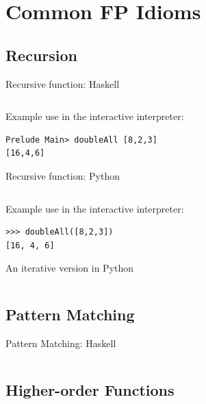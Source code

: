 \documentclass{beamer}
\begin{document}
\section{Common FP Idioms}
\subsection{Recursion}

\begin{frame}[fragile]{Recursive function: Haskell}

  \inputminted[lastline=3]{haskell}{code/doubleall_recursion.hs}

  \vskip5mm

Example use in the interactive interpreter:
  \begin{verbatim}
Prelude Main> doubleAll [8,2,3]
[16,4,6]
  \end{verbatim}

\end{frame}

\begin{frame}[fragile]{Recursive function: Python}

  \inputminted[firstline=3]{python}{code/doubleall_recursion.py}

  \vskip5mm

Example use in the interactive interpreter:

  \begin{verbatim}
>>> doubleAll([8,2,3])
[16, 4, 6]
  \end{verbatim}

\end{frame}

\begin{frame}{An iterative version in Python}

  \inputminted[firstline=3]{python}{code/doubleall_iterative.py}

\end{frame}

\subsection{Pattern Matching}

\begin{frame}{Pattern Matching: Haskell}

  \inputminted[lastline=3]{haskell}{code/doubleall_recursion.hs}

\end{frame}

\subsection{Higher-order Functions}
\end{document}
